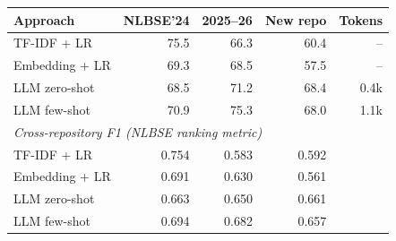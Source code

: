 \begin{tabular}{lrrrr}
\toprule
Approach & NLBSE'24 & 2025--26 & New repo & Tokens \\
\midrule
TF-IDF + LR & 75.5 & 66.3 & 60.4 & -- \\
Embedding + LR & 69.3 & 68.5 & 57.5 & -- \\
LLM zero-shot & 68.5 & 71.2 & 68.4 & 0.4k \\
LLM few-shot & 70.9 & 75.3 & 68.0 & 1.1k \\
\midrule
\multicolumn{5}{l}{\emph{Cross-repository F1 (NLBSE ranking metric)}} \\
TF-IDF + LR & 0.754 & 0.583 & 0.592 & \\
Embedding + LR & 0.691 & 0.630 & 0.561 & \\
LLM zero-shot & 0.663 & 0.650 & 0.661 & \\
LLM few-shot & 0.694 & 0.682 & 0.657 & \\
\bottomrule
\end{tabular}
